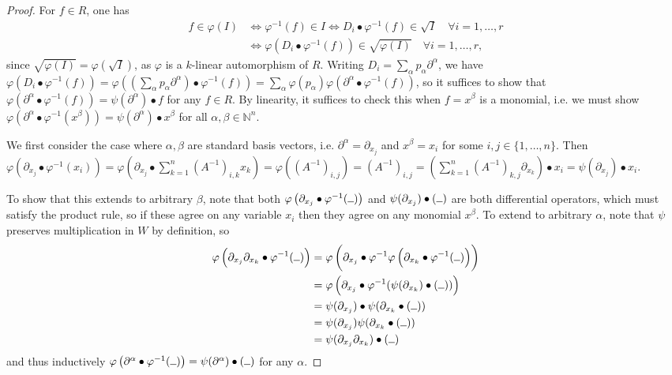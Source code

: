 \documentclass[letterpaper]{article}
\theoremstyle{plain}
\theoremstyle{definition}
\theoremstyle{remark}
\begin{document}
\begin{proof}
For $f \in R$, one has
\begin{align*}
f \in \varphi(I) &\iff \varphi^{-1}(f) \in I \iff D_i \bullet \varphi^{-1}(f) \in \sqrt{I} \quad \forall i = 1, \ldots, r \\
&\iff \varphi(D_i \bullet \varphi^{-1}(f)) \in \sqrt{\varphi(I)} \quad \forall i = 1, \ldots, r,
\end{align*}
since $\sqrt{\varphi(I)} = \varphi(\sqrt{I})$, as $\varphi$ is a $k$-linear automorphism of $R$. Writing $D_i = \sum_\alpha p_\alpha \partial^\alpha$, we have $\varphi(D_i \bullet \varphi^{-1}(f)) = \varphi( (\sum_\alpha p_\alpha \partial^\alpha) \bullet \varphi^{-1}(f)) = \sum_\alpha \varphi(p_\alpha) \varphi(\partial^\alpha \bullet \varphi^{-1}(f))$, so it suffices to show that $\varphi(\partial^\alpha \bullet \varphi^{-1}(f)) = \psi(\partial^\alpha) \bullet f$ for any $f \in R$. By linearity, it suffices to check this when $f = x^\beta$ is a monomial, i.e. we must show $\varphi(\partial^\alpha \bullet \varphi^{-1}(x^\beta)) = \psi(\partial^\alpha) \bullet x^\beta$ for all $\alpha, \beta \in \mathbb{N}^n$. 

We first consider the case where $\alpha, \beta$ are standard basis vectors, i.e. $\partial^\alpha = \partial_{x_j}$ and $x^\beta = x_i$ for some $i, j \in \{1, \ldots, n\}$. Then $\varphi \left(\partial_{x_j} \bullet \varphi^{-1}(x_i) \right) = \varphi \left(\partial_{x_j} \bullet \sum_{k=1}^n (A^{-1})_{i,k} x_k \right) = \varphi \left((A^{-1})_{i,j} \right) = (A^{-1})_{i,j} = \left( \sum_{k=1}^n (A^{-1})_{k,j} \partial_{x_k} \right) \bullet x_i = \psi(\partial_{x_j}) \bullet x_i$.

To show that this extends to arbitrary $\beta$, note that both $\varphi \left( \partial_{x_j} \bullet \varphi^{-1}( \rule{0.2cm}{0.15mm}) \right)$ and $\psi(\partial_{x_j}) \bullet ( \rule{0.2cm}{0.15mm})$ are both differential operators, which must satisfy the product rule, so if these agree on any variable $x_i$ then they agree on any monomial $x^\beta$. To extend to arbitrary $\alpha$, note that $\psi$ preserves multiplication in $W$ by definition, so
\begin{align*}
\varphi \left( \partial_{x_j} \partial_{x_k} \bullet \varphi^{-1}(\rule{0.2cm}{0.15mm}) \right) &= 
\varphi \left( \partial_{x_j} \bullet \varphi^{-1} \varphi \left( \partial_{x_k} \bullet \varphi^{-1}(\rule{0.2cm}{0.15mm}) \right) \right) \\
&= \varphi \left( \partial_{x_j} \bullet \varphi^{-1} (\psi(\partial_{x_k}) \bullet (\rule{0.2cm}{0.15mm}) ) \right) \\
&= \psi(\partial_{x_j}) \bullet \psi(\partial_{x_k} \bullet ( \rule{0.2cm}{0.15mm} )) \\
&= \psi(\partial_{x_j}) \psi(\partial_{x_k} \bullet ( \rule{0.2cm}{0.15mm} )) \\
&= \psi(\partial_{x_j} \partial_{x_k}) \bullet ( \rule{0.2cm}{0.15mm} )
\end{align*}
and thus inductively $\varphi \left( \partial^\alpha \bullet \varphi^{-1}(\rule{0.2cm}{0.15mm}) \right) = \psi(\partial^\alpha) \bullet (\rule{0.2cm}{0.15mm})$ for any $\alpha$.
\end{proof}


\nocite*
{}

\end{document}
